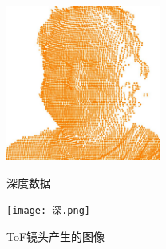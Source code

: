 \documentclass[UTF8]{ctexart}
\begin{document}
\begin{figure} 
	\begin{minipage}[t]{0.5\linewidth} 
		\centering 
		\includegraphics[width=2.0in]{深度数据.jpg} 
		\caption{深度数据} 

	\end{minipage}%
	\begin{minipage}[t]{0.5\linewidth} 
		\centering 
		\texttt{[image: 深.png]} 
		\caption{ToF镜头产生的图像} 

	\end{minipage} 
\end{figure}
\end{document}

